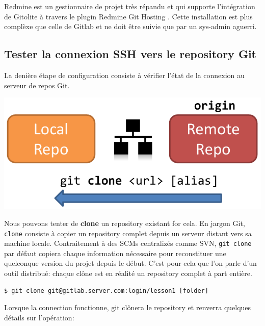 \documentclass{../../common/tufte-latex/tufte-handout}
\begin{document}
\noindent Redmine est un gestionnaire de projet très répandu et qui supporte l'intégration de Gitolite à travers le plugin Redmine Git Hosting . Cette installation est plus complèxe que celle de Gitlab et ne doit être suivie que par un sys-admin aguerri.

\subsection{Tester la connexion SSH vers le repository Git}

La denière étape de configuration consiste à vérifier l'état de la connexion au serveur de repos Git.

\begin{marginfigure}%
  \centering
  \includegraphics[width=\linewidth]{gitclone-schema.pdf}
  \label{fig:gitclone}
\end{marginfigure}
Nous pouvons tenter de \textbf{clone} un repository existant for cela.
En jargon Git, \texttt{clone} consiste à copier un repository complet depuis un serveur distant vers sa machine locale.
Contraitement à des SCMs centralizés comme SVN, \texttt{git clone} par défaut copiera chaque information nécessaire pour reconstituer une quelconque version du projet depuis le début.
C'est pour cela que l'on parle d'un outil distribué: chaque clône est en réalité un repository complet à part entière.

\begin{lstlisting}[style=BashInputStyle]
  $ git clone git@gitlab.server.com:login/lesson1 [folder]
\end{lstlisting}

\noindent Lorsque la connection fonctionne, git clônera le repository et renverra quelques détails sur l'opération:
\end{document}
